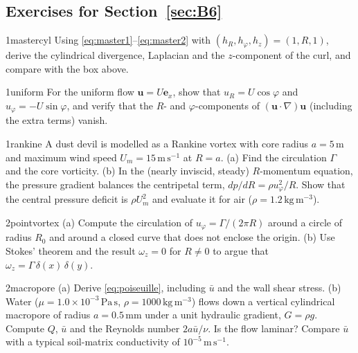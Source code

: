 \documentclass[11pt,letterpaper]{article}
\numberwithin{equation}{section}
\newcommand{\uu}{\mathbf{u}}
\newcommand{\e}[1]{\mathbf{e}_{#1}}
\newcommand{\units}[1]{\,\mathrm{#1}}
\begin{document}
\subsection*{Exercises for Section~\ref{sec:B6}}

\begin{exercise}{1}{mastercyl}
Using \eqref{eq:master1}--\eqref{eq:master2} with $(h_R,h_\varphi,h_z)=(1,R,1)$, derive the cylindrical divergence, Laplacian and the $z$-component
of the curl, and compare with the box above.
\end{exercise}

\begin{exercise}{1}{uniform}
For the uniform flow $\uu=U\e{x}$, show that $u_R=U\cos\varphi$ and $u_\varphi=-U\sin\varphi$, and verify that the $R$- and
$\varphi$-components of $(\uu\cdot\nabla)\uu$ (including the extra terms) vanish.
\end{exercise}

\begin{exercise}{1}{rankine}
A dust devil is modelled as a Rankine vortex with core radius $a=5\units{m}$ and maximum wind speed $U_m=15\units{m\,s^{-1}}$ at $R=a$.
(a) Find the circulation $\Gamma$ and the core vorticity.
(b) In the (nearly inviscid, steady) $R$-momentum equation, the pressure gradient balances the centripetal term,
$dp/dR=\rho u_\varphi^2/R$. Show that the central pressure deficit is $\rho U_m^2$ and evaluate it for air ($\rho=1.2\units{kg\,m^{-3}}$).
\end{exercise}

\begin{exercise}{2}{pointvortex}
(a) Compute the circulation of $u_\varphi=\Gamma/(2\pi R)$ around a circle of radius $R_0$ and around a closed curve that does not
enclose the origin.
(b) Use Stokes' theorem and the result $\omega_z=0$ for $R\neq0$ to argue that $\omega_z=\Gamma\,\delta(x)\,\delta(y)$.
\end{exercise}

\begin{exercise}{2}{macropore}
(a) Derive \eqref{eq:poiseuille}, including $\bar u$ and the wall shear stress.
(b) Water ($\mu=1.0\times10^{-3}\units{Pa\,s}$, $\rho=1000\units{kg\,m^{-3}}$) flows down a vertical cylindrical macropore of radius
$a=0.5\units{mm}$ under a unit hydraulic gradient, $G=\rho g$. Compute $Q$, $\bar u$ and the Reynolds number $2a\bar u/\nu$. Is the flow
laminar? Compare $\bar u$ with a typical soil-matrix conductivity of $10^{-5}\units{m\,s^{-1}}$.
\end{exercise}
\end{document}
